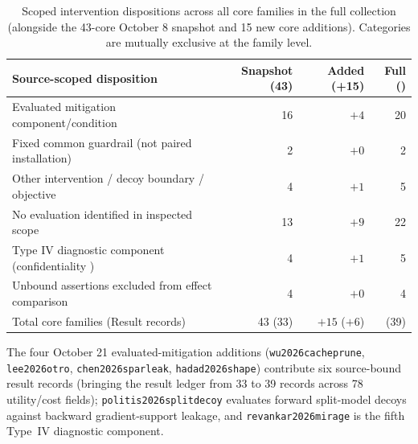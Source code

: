 \begin{table}[t]\centering\footnotesize
\caption{Scoped intervention dispositions across all \FinalCore{} core families in the full collection (alongside the 43-core October 8 snapshot and 15 new core additions). Categories are mutually exclusive at the family level.}\label{tab:intervention-status}
\begin{tabularx}{\columnwidth}{@{}Yrrr@{}}\toprule
Source-scoped disposition & Snapshot (43) & Added (+15) & Full (\FinalCore{})\\\midrule
Evaluated mitigation component/condition & 16 & $+4$ & 20\\
Fixed common guardrail (not paired installation) & 2 & $+0$ & 2\\
Other intervention / decoy boundary / objective & 4 & $+1$ & 5\\
No evaluation identified in inspected scope & 13 & $+9$ & 22\\
Type IV diagnostic component (confidentiality \NA{}) & 4 & $+1$ & 5\\
Unbound assertions excluded from effect comparison & 4 & $+0$ & 4\\\midrule
Total core families (Result records) & 43 (33) & $+15$ ($+6$) & \FinalCore{} (39)\\\bottomrule
\end{tabularx}
\par\smallskip\raggedright\footnotesize
The four October 21 evaluated-mitigation additions (\texttt{wu2026cacheprune}, \texttt{lee2026otro}, \texttt{chen2026sparleak}, \texttt{hadad2026shape}) contribute six source-bound result records (bringing the result ledger from 33 to 39 records across 78 utility/cost fields); \texttt{politis2026splitdecoy} evaluates forward split-model decoys against backward gradient-support leakage, and \texttt{revankar2026mirage} is the fifth Type~IV diagnostic component.
\end{table}

